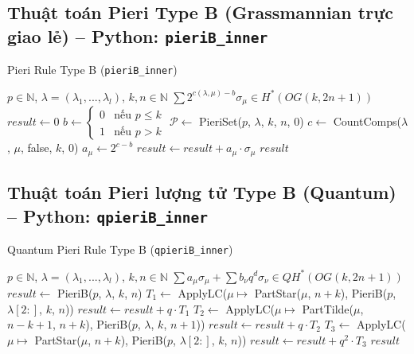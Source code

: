 
\subsection*{Thuật toán Pieri Type B (Grassmannian trực giao lẻ) -- Python: \texttt{pieriB\_inner}}

\begin{algorithm}[H]
\caption{Pieri Rule Type B (\texttt{pieriB\_inner})}
\begin{algorithmic}[1]
\REQUIRE $p \in \mathbb{N}$, $\lambda = (\lambda_1, ..., \lambda_l)$, $k, n \in \mathbb{N}$
\ENSURE $\sum 2^{c(\lambda,\mu)-b} \sigma_\mu \in H^*(OG(k,2n+1))$
\STATE $result \gets 0$
\STATE $b \gets \begin{cases}0 & \text{nếu } p \leq k \\ 1 & \text{nếu } p > k\end{cases}$
\STATE $\mathcal{P} \gets$ PieriSet($p$, $\lambda$, $k$, $n$, $0$)
    \STATE $c \gets$ CountComps($\lambda$, $\mu$, false, $k$, $0$)
    \STATE $a_\mu \gets 2^{c-b}$
    \STATE $result \gets result + a_\mu \cdot \sigma_\mu$
\ENDFOR
\RETURN $result$
\end{algorithmic}
\end{algorithm}

\subsection*{Thuật toán Pieri lượng tử Type B (Quantum) -- Python: \texttt{qpieriB\_inner}}

\begin{algorithm}[H]
\caption{Quantum Pieri Rule Type B (\texttt{qpieriB\_inner})}
\begin{algorithmic}[1]
\REQUIRE $p \in \mathbb{N}$, $\lambda = (\lambda_1, ..., \lambda_l)$, $k, n \in \mathbb{N}$
\ENSURE $\sum a_\mu \sigma_\mu + \sum b_\nu q^d \sigma_\nu \in QH^*(OG(k,2n+1))$
\STATE $result \gets$ PieriB($p$, $\lambda$, $k$, $n$) 
        \STATE $T_1 \gets$ ApplyLC($\mu \mapsto$ PartStar($\mu$, $n+k$), PieriB($p$, $\lambda[2:]$, $k$, $n$))
        \STATE $result \gets result + q \cdot T_1$
    \ENDIF
\ELSE
        \STATE $T_2 \gets$ ApplyLC($\mu \mapsto$ PartTilde($\mu$, $n-k+1$, $n+k$), PieriB($p$, $\lambda$, $k$, $n+1$))
        \STATE $result \gets result + q \cdot T_2$
    \ENDIF
        \STATE $T_3 \gets$ ApplyLC($\mu \mapsto$ PartStar($\mu$, $n+k$), PieriB($p$, $\lambda[2:]$, $k$, $n$))
        \STATE $result \gets result + q^2 \cdot T_3$
    \ENDIF
\ENDIF
\RETURN $result$
\end{algorithmic}
\end{algorithm}

